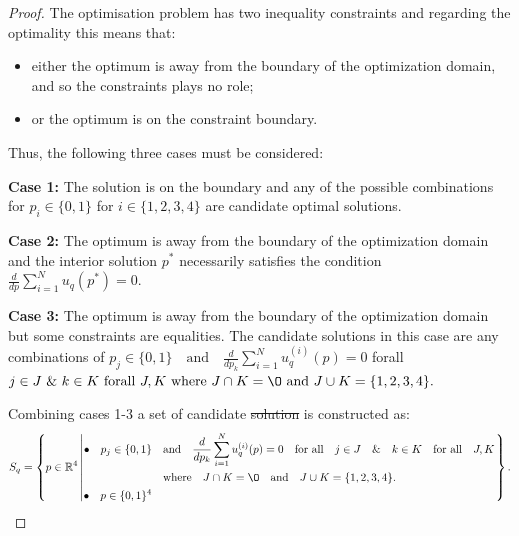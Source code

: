 \documentclass[10pt]{article}
\providecommand{\DIFaddtex}[1]{{\protect\color{blue}\uwave{#1}}} %
\providecommand{\DIFdeltex}[1]{{\protect\color{red}\sout{#1}}}                      %
\providecommand{\DIFaddbegin}{} %
\providecommand{\DIFaddend}{} %
\providecommand{\DIFdelbegin}{} %
\providecommand{\DIFdelend}{} %
\providecommand{\DIFadd}[1]{\texorpdfstring{\DIFaddtex{#1}}{#1}} %
\providecommand{\DIFdel}[1]{\texorpdfstring{\DIFdeltex{#1}}{}} %
\newcommand{\DIFscaledelfig}{0.5}
\newlength{\DIFdelgraphicswidth} %
\newlength{\DIFdelgraphicsheight} %
\newcommand{\DIFaddincludegraphics}[2][]{{\color{blue}\fbox{\DIFOincludegraphics[#1]{#2}}}} %
\newcommand{\DIFdelincludegraphics}[2][]{%
\sbox{\DIFdelgraphicsbox}{\DIFOincludegraphics[#1]{#2}}%
\settoboxwidth{\DIFdelgraphicswidth}{\DIFdelgraphicsbox} %
\settoboxtotalheight{\DIFdelgraphicsheight}{\DIFdelgraphicsbox} %
\scalebox{\DIFscaledelfig}{%
\parbox[b]{\DIFdelgraphicswidth}{\usebox{\DIFdelgraphicsbox}\\[-\baselineskip] \rule{\DIFdelgraphicswidth}{0em}}\llap{\resizebox{\DIFdelgraphicswidth}{\DIFdelgraphicsheight}{%
\setlength{\unitlength}{\DIFdelgraphicswidth}%
\begin{picture}(1,1)%
\thicklines\linethickness{2pt} %
{\color[rgb]{1,0,0}\put(0,0){\framebox(1,1){}}}%
{\color[rgb]{1,0,0}\put(0,0){\line( 1,1){1}}}%
{\color[rgb]{1,0,0}\put(0,1){\line(1,-1){1}}}%
\end{picture}%
}\hspace*{3pt}}} %
} %
\DeclareRobustCommand{\DIFaddbegin}{\DIFOaddbegin \let\includegraphics\DIFaddincludegraphics} %
\DeclareRobustCommand{\DIFaddend}{\DIFOaddend \let\includegraphics\DIFOincludegraphics} %
\DeclareRobustCommand{\DIFdelbegin}{\DIFOdelbegin \let\includegraphics\DIFdelincludegraphics} %
\DeclareRobustCommand{\DIFdelend}{\DIFOaddend \let\includegraphics\DIFOincludegraphics} %
\begin{document}
\begin{proof}
    The optimisation problem has two inequality constraints and regarding the
    optimality this means that:

    \begin{itemize}
        \item either the optimum is away from the boundary of the optimization
        domain, and so the constraints plays no role;
        \item or the optimum is on the constraint boundary.
    \end{itemize}

    Thus, the following three cases must be considered:

    \textbf{Case 1:} The solution is on the boundary and any of the possible
    combinations for $p_i \in \{0, 1\}$ for $i \in \{1, 2, 3, 4\}$ are candidate
    optimal solutions.

    \textbf{Case 2:} The optimum is away from the boundary of the optimization
    domain and the interior solution $p^*$ necessarily satisfies the condition
    \(\frac{d}{dp} \sum\limits_{i=1} ^ N  u_q(p^*) = 0\).

    \textbf{Case 3:} The optimum is away from the boundary of the optimization
    domain but some constraints are equalities. The candidate solutions in this
    case are any combinations of $p_j \in \{0, 1\} \quad \text{and} \quad
    \frac{d}{dp_k} \sum\limits_{i=1} ^ N  u_q^{(i)}(p) = 0$ forall $ j \in J
    \text{ \& } k \in K \text{ forall } J, K \text{ where } J \cap K = \O
    \text{ and } J \cup K = \{1, 2, 3, 4\}.$

    Combining cases 1-3 a set of candidate \DIFdelbegin \DIFdel{solution }\DIFdelend \DIFaddbegin \DIFadd{solutions, denoted as \(S_q\), }\DIFaddend is
    constructed as: {\scriptsize
    \begin{equation*}
        S_q =
        \left\{p \in \mathbb{R} ^ 4 \left|
            \begin{aligned}
                \bullet\quad p_j \in \{0, 1\} & \quad \text{and} \quad \frac{d}{dp_k}
                \sum\limits_{i=1} ^ N  u_q^{(i)}(p) = 0
                \quad \text{for all} \quad j \in J \quad \&  \quad k \in K  \quad \text{for all} \quad J, K \\
                & \quad \text{where} \quad J \cap K = \O \quad
                \text{and} \quad J \cup K = \{1, 2, 3, 4\}.\\
                \bullet\quad  p \in \{0, 1\} ^ 4
            \end{aligned}\right.
        \right\}.
    \end{equation*}}


\end{proof}
\end{document}

